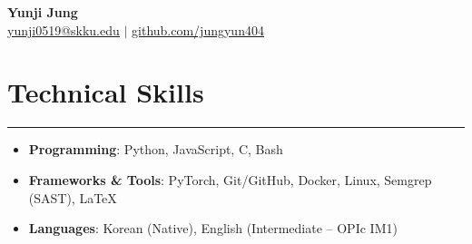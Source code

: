 \documentclass[letterpaper, 10pt]{article}
\begin{document}
\begin{center}
   \textbf{\LARGE Yunji Jung} \\ \vspace{2pt}
   \href{mailto:yunji0519@skku.edu}{\underline{yunji0519@skku.edu}} $|$
   \href{https://github.com/jungyun404}{\underline{github.com/jungyun404}}
\end{center}

\section*{Technical Skills}
\hrule
\vspace{4pt}
\begin{itemize}
  \item[] \textbf{Programming}: Python, JavaScript, C, Bash
  \item[] \textbf{Frameworks \& Tools}: PyTorch, Git/GitHub, Docker, Linux, Semgrep (SAST), \LaTeX
  \item[] \textbf{Languages}: Korean (Native), English (Intermediate -- OPIc IM1)
\end{itemize}

\end{document}
